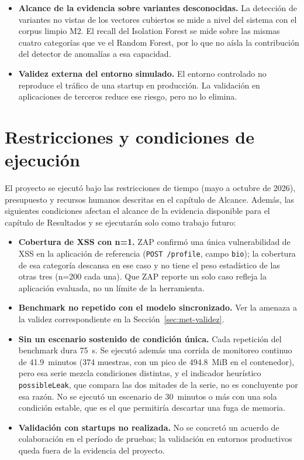 \begin{itemize}
    todo las de SQLi; este trabajo no cuantificó ese efecto. El análisis por distancia de
    Levenshtein (211 pares, todos de la fuente CAPEC) lo subestimó, porque solo compara consultas de
    1 a 100 caracteres y hasta 10{,}000 comparaciones por clase.
    \item \textbf{Alcance de la evidencia sobre variantes desconocidas.} La detección de
    variantes no vistas de los vectores cubiertos se mide a nivel del sistema con el corpus limpio
    M2. El recall del Isolation Forest se mide sobre las mismas cuatro categorías que ve el Random
    Forest, por lo que no aísla la contribución del detector de anomalías a esa capacidad.
    \item \textbf{Validez externa del entorno simulado.} El entorno controlado no reproduce el
    tráfico de una startup en producción. La validación en aplicaciones de terceros reduce ese
    riesgo, pero no lo elimina.
\end{itemize}

\section{Restricciones y condiciones de ejecución}
\label{sec:met-restricciones}

El proyecto se ejecutó bajo las restricciones de tiempo (mayo a octubre de 2026), presupuesto y
recursos humanos descritas en el capítulo de Alcance. Además, las siguientes condiciones afectan
el alcance de la evidencia disponible para el capítulo de Resultados y se ejecutarán solo como
trabajo futuro:

\begin{itemize}
    \item \textbf{Cobertura de XSS con n=1.} ZAP confirmó una única vulnerabilidad de XSS en la
    aplicación de referencia (\texttt{POST /profile}, campo \texttt{bio}); la cobertura de esa
    categoría descansa en ese caso y no tiene el peso estadístico de las otras tres (n=200 cada
    una). Que ZAP reporte un solo caso refleja la aplicación evaluada, no un límite de la
    herramienta.
    \item \textbf{Benchmark no repetido con el modelo sincronizado.} Ver la amenaza a la validez
    correspondiente en la Sección~\ref{sec:met-validez}.
    \item \textbf{Sin un escenario sostenido de condición única.} Cada repetición del benchmark
    dura 75~s. Se ejecutó además una corrida de monitoreo continuo de 41.9~minutos (374 muestras,
    con un pico de 494.8~MiB en el contenedor), pero esa serie mezcla condiciones distintas, y el
    indicador heurístico \texttt{possibleLeak}, que compara las dos mitades de la serie, no es
    concluyente por esa razón. No se ejecutó un escenario de 30~minutos o más con una sola condición
    estable, que es el que permitiría descartar una fuga de memoria.
    \item \textbf{Validación con startups no realizada.} No se concretó un acuerdo de
    colaboración en el período de pruebas; la validación en entornos productivos queda fuera de
    la evidencia del proyecto.
\end{itemize}

